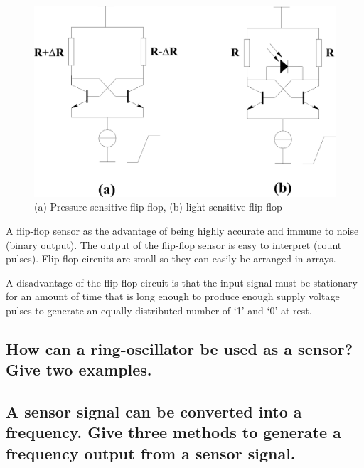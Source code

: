 \documentclass[10pt,a4paper]{article}
\begin{document}
\begin{figure}[h!]
    \centering
    \includegraphics{flip-flop.png}
    \caption{(a) Pressure sensitive flip-flop, (b) light-sensitive flip-flop}
    \label{fig:flip-flop}
\end{figure}

A flip-flop sensor as the advantage of being highly accurate and immune to noise (binary output). The output of the flip-flop sensor is easy to interpret (count pulses). Flip-flop circuits are small so they can easily be arranged in arrays.

A disadvantage of the flip-flop circuit is that the input signal must be stationary for an amount of time that is long enough to produce enough supply voltage pulses to generate an equally distributed number of `1' and `0' at rest. 

\subsection{How can a ring-oscillator be used as a sensor? Give two examples.}


\subsection{A sensor signal can be converted into a frequency. Give three methods to generate a frequency output from a
sensor signal.}

\end{document}
